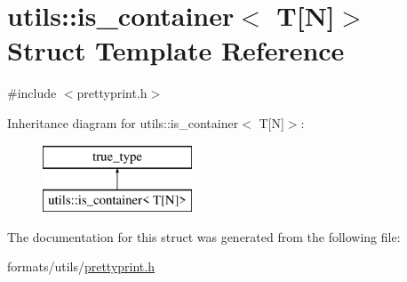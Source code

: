 \hypertarget{structutils_1_1is__container_3_01_t[_n]_4}{}\section{utils\+::is\+\_\+container$<$ T\mbox{[}N\mbox{]}$>$ Struct Template Reference}
\label{structutils_1_1is__container_3_01_t[_n]_4}


{\ttfamily \#include $<$prettyprint.\+h$>$}

Inheritance diagram for utils\+::is\+\_\+container$<$ T\mbox{[}N\mbox{]}$>$\+:\begin{figure}[H]
\begin{center}
\leavevmode
\includegraphics[height=2.000000cm]{d1/d8f/structutils_1_1is__container_3_01_t[_n]_4}
\end{center}
\end{figure}


The documentation for this struct was generated from the following file\+:\begin{DoxyCompactItemize}
\item 
formats/utils/\mbox{\hyperlink{prettyprint_8h}{prettyprint.\+h}}\end{DoxyCompactItemize}
